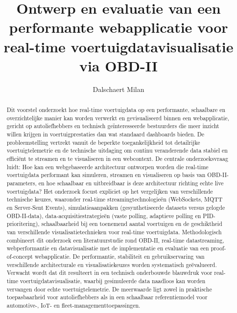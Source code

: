 \documentclass{hogent-article}
\title{Ontwerp en evaluatie van een performante webapplicatie voor real-time voertuigdatavisualisatie via OBD-II}
\author{Dalschaert Milan}
\begin{document}
\begin{abstract}
    Dit voorstel onderzoekt hoe real-time voertuigdata op een performante, schaalbare en overzichtelijke manier kan worden verwerkt en gevisualiseerd binnen een webapplicatie, gericht op autoliefhebbers en technisch geïnteresseerde bestuurders die meer inzicht willen krijgen in voertuigprestaties dan wat standaard dashboards bieden. De probleemstelling vertrekt vanuit de beperkte toegankelijkheid tot detailrijke voertuigtelemetrie en de technische uitdaging om continu veranderende data stabiel en efficiënt te streamen en te visualiseren in een webcontext.
    De centrale onderzoeksvraag luidt: Hoe kan een webgebaseerde architectuur ontworpen worden die real-time voertuigdata performant kan simuleren, streamen en visualiseren op basis van OBD-II-parameters, en hoe schaalbaar en uitbreidbaar is deze architectuur richting echte live voertuigdata?
    Het onderzoek focust expliciet op het vergelijken van verschillende technische keuzes, waaronder real-time streamingtechnologieën (WebSockets, MQTT en Server-Sent Events), simulatieaanpakken (gesynthetiseerde datasets versus gelogde OBD-II-data), data-acquisitiestrategieën (vaste polling, adaptieve polling en PID-prioritering), schaalbaarheid bij een toenemend aantal voertuigen en de geschiktheid van verschillende visualisatietechnieken voor real-time voertuigdata.
    Methodologisch combineert dit onderzoek een literatuurstudie rond OBD-II, real-time datastreaming, webperformantie en datavisualisatie met de implementatie en evaluatie van een proof-of-concept webapplicatie. De performantie, stabiliteit en gebruikservaring van verschillende architecturale en visualisatiekeuzes worden systematisch geëvalueerd. Verwacht wordt dat dit resulteert in een technisch onderbouwde blauwdruk voor real-time voertuigdatavisualisatie, waarbij gesimuleerde data naadloos kan worden vervangen door echte voertuigtelemetrie. De meerwaarde ligt zowel in praktische toepasbaarheid voor autoliefhebbers als in een schaalbaar referentiemodel voor automotive-, IoT- en fleet-managementtoepassingen.
\end{abstract}


\tableofcontents



\printbibliography[heading=bibintoc]
\end{document}
